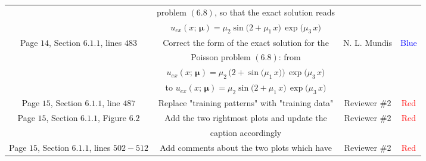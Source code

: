 \documentclass[longtitle]{elsarticle}
\theoremstyle{theorem}
\theoremstyle{definition}
\theoremstyle{remark}
\theoremstyle{proposition}
\numberwithin{figure}{section}
\newcommand{\bg}[1]{\boldsymbol{#1}}
\begin{document}
\begin{longtable}{c|c|c|c}
		\multicolumn{1}{|c|}{} &
		\multicolumn{1}{c|}{problem $(6.8)$, so that the exact solution reads} &
		\multicolumn{1}{c|}{} &
		\multicolumn{1}{c|}{} \\[-0.1cm]
		\multicolumn{1}{|c|}{} &
		\multicolumn{1}{c|}{$u_{ex}(x; \, \bg{\mu}) = \mu_2 \sin \big(2 + \mu_1 \, x \big) \, \exp \big( \mu_3 \, x \big)$} &
		\multicolumn{1}{c|}{} &
		\multicolumn{1}{c|}{} \\[0.1cm]
		\cline{1-4}
		\multicolumn{1}{|c|}{\multirow{4}{*}{Page $14$, Section $6.1.1$, lines $483$}} & 
		\multicolumn{1}{c|}{Correct the form of the exact solution for the} &
		\multicolumn{1}{c|}{\multirow{4}{*}{N. L. Mundis}} &
		\multicolumn{1}{c|}{\multirow{4}{*}{\textcolor{blue}{Blue}}} \\[-0.1cm]
		\multicolumn{1}{|c|}{} &
		\multicolumn{1}{c|}{Poisson problem $(6.8)$: from} &
		\multicolumn{1}{c|}{} &
		\multicolumn{1}{c|}{} \\[-0.1cm]
		\multicolumn{1}{|c|}{} &
		\multicolumn{1}{c|}{$u_{ex}(x; \, \bg{\mu}) = \mu_2 \, \big( 2 + \sin \big( \mu_1 \, x \big) \big) \, \exp \big( \mu_3 \, x \big)$} &
		\multicolumn{1}{c|}{} &
		\multicolumn{1}{c|}{} \\[-0.1cm]
		\multicolumn{1}{|c|}{} &
		\multicolumn{1}{c|}{to $u_{ex}(x; \, \bg{\mu}) = \mu_2 \sin \big(2 + \mu_1 \, x \big) \, \exp \big( \mu_3 \, x \big)$} &
		\multicolumn{1}{c|}{} &
		\multicolumn{1}{c|}{} \\[0.1cm]
		\cline{1-4}
		\multicolumn{1}{|c|}{Page $15$, Section $6.1.1$, line $487$} & 
		\multicolumn{1}{c|}{Replace "training patterns" with "training data"} &
		\multicolumn{1}{c|}{Reviewer \#2} &
		\multicolumn{1}{c|}{\textcolor{red}{Red}} \\
		\cline{1-4} 
		\multicolumn{1}{|c|}{\multirow{2}{*}{Page $15$, Section $6.1.1$, Figure $6.2$}} & 
		\multicolumn{1}{c|}{Add the two rightmost plots and update the} &
		\multicolumn{1}{c|}{\multirow{2}{*}{Reviewer \#2}} &
		\multicolumn{1}{c|}{\multirow{2}{*}{\textcolor{red}{Red}}} \\[-0.1cm]
		\multicolumn{1}{|c|}{} &
		\multicolumn{1}{c|}{caption accordingly} &
		\multicolumn{1}{c|}{} &
		\multicolumn{1}{c|}{} \\[0.1cm]
		\cline{1-4}
		\multicolumn{1}{|c|}{\multirow{2}{*}{Page $15$, Section $6.1.1$, lines $502-512$}} & 
		\multicolumn{1}{c|}{Add comments about the two plots which have} &
		\multicolumn{1}{c|}{\multirow{2}{*}{Reviewer \#2}} &
		\multicolumn{1}{c|}{\multirow{2}{*}{\textcolor{red}{Red}}} \\[-0.1cm]

\end{longtable}
\end{document}
